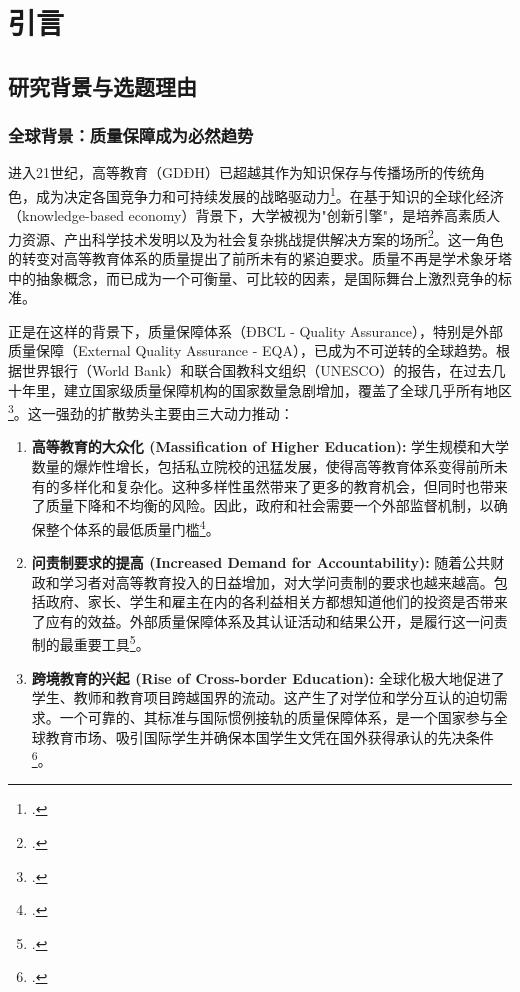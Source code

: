 \chapter{引言}
\label{chap:gioi_thieu}

\section{研究背景与选题理由}
\label{sec:boi_canh_ly_do}

\subsection{全球背景：质量保障成为必然趋势}

进入21世纪，高等教育（GDĐH）已超越其作为知识保存与传播场所的传统角色，成为决定各国竞争力和可持续发展的战略驱动力\footcite{Altbach2001}。在基于知识的全球化经济（knowledge-based economy）背景下，大学被视为"创新引擎"，是培养高素质人力资源、产出科学技术发明以及为社会复杂挑战提供解决方案的场所\footcite{OECD_HE2008}。这一角色的转变对高等教育体系的质量提出了前所未有的紧迫要求。质量不再是学术象牙塔中的抽象概念，而已成为一个可衡量、可比较的因素，是国际舞台上激烈竞争的标准。

正是在这样的背景下，质量保障体系（ĐBCL - Quality Assurance），特别是外部质量保障（External Quality Assurance - EQA），已成为不可逆转的全球趋势。根据世界银行（World Bank）和联合国教科文组织（UNESCO）的报告，在过去几十年里，建立国家级质量保障机构的国家数量急剧增加，覆盖了全球几乎所有地区\footcite{WorldBank_QA_GlobalTrends}。这一强劲的扩散势头主要由三大动力推动：

\begin{enumerate}
    \item \textbf{高等教育的大众化 (Massification of Higher Education):} 学生规模和大学数量的爆炸性增长，包括私立院校的迅猛发展，使得高等教育体系变得前所未有的多样化和复杂化。这种多样性虽然带来了更多的教育机会，但同时也带来了质量下降和不均衡的风险。因此，政府和社会需要一个外部监督机制，以确保整个体系的最低质量门槛\footcite{Trow2007}。
    
    \item \textbf{问责制要求的提高 (Increased Demand for Accountability):} 随着公共财政和学习者对高等教育投入的日益增加，对大学问责制的要求也越来越高。包括政府、家长、学生和雇主在内的各利益相关方都想知道他们的投资是否带来了应有的效益。外部质量保障体系及其认证活动和结果公开，是履行这一问责制的最重要工具\footcite{Harvey2005}。
    
    \item \textbf{跨境教育的兴起 (Rise of Cross-border Education):} 全球化极大地促进了学生、教师和教育项目跨越国界的流动。这产生了对学位和学分互认的迫切需求。一个可靠的、其标准与国际惯例接轨的质量保障体系，是一个国家参与全球教育市场、吸引国际学生并确保本国学生文凭在国外获得承认的先决条件\footcite{Knight2006}。
\end{enumerate}

